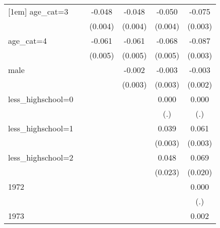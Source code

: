 {\begin{tabular}{l*{5}{c}}
[1em]
age\_cat=3           &                     &      -0.048\sym{***}&      -0.048\sym{***}&      -0.050\sym{***}&      -0.075\sym{***}\\
                    &                     &     (0.004)         &     (0.004)         &     (0.004)         &     (0.003)         \\
[1em]
age\_cat=4           &                     &      -0.061\sym{***}&      -0.061\sym{***}&      -0.068\sym{***}&      -0.087\sym{***}\\
                    &                     &     (0.005)         &     (0.005)         &     (0.005)         &     (0.003)         \\
[1em]
male                &                     &                     &      -0.002         &      -0.003         &      -0.003         \\
                    &                     &                     &     (0.003)         &     (0.003)         &     (0.002)         \\
[1em]
less\_highschool=0   &                     &                     &                     &       0.000         &       0.000         \\
                    &                     &                     &                     &         (.)         &         (.)         \\
[1em]
less\_highschool=1   &                     &                     &                     &       0.039\sym{***}&       0.061\sym{***}\\
                    &                     &                     &                     &     (0.003)         &     (0.003)         \\
[1em]
less\_highschool=2   &                     &                     &                     &       0.048\sym{*}  &       0.069\sym{***}\\
                    &                     &                     &                     &     (0.023)         &     (0.020)         \\
[1em]
1972                &                     &                     &                     &                     &       0.000         \\
                    &                     &                     &                     &                     &         (.)         \\
[1em]
1973                &                     &                     &                     &                     &       0.002         \\

\end{tabular}}
